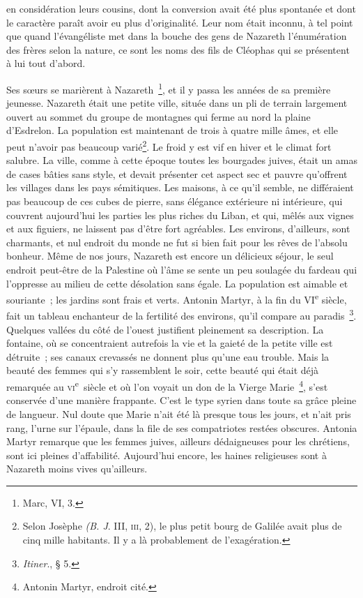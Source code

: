 \documentclass[french,twoside]{book} %
\begin{document}
en considération leurs cousins, dont la conversion avait été plus spontanée et dont le caractère paraît avoir eu plus d’originalité. Leur nom était inconnu, à tel point que quand l’évangéliste met dans la bouche des gens de Nazareth l’énumération des frères selon la nature, ce sont les noms des fils de Cléophas qui se présentent à lui tout d’abord.\par
Ses sœurs se marièrent à Nazareth \footnote{Marc, VI, 3.}, et il y passa les années de sa première jeunesse. Nazareth était une petite ville, située dans un pli de terrain largement ouvert au sommet du groupe de montagnes qui ferme au nord la plaine d’Esdrelon. La population est maintenant de trois à quatre mille âmes, et elle peut n’avoir pas beaucoup varié\footnote{Selon Josèphe {\itshape (B. J}. III, \textsc{iii}, 2), le plus petit bourg de Galilée avait plus de cinq mille habitants. Il y a là probablement de l’exagération.}. Le froid y est vif en hiver et le climat fort salubre. La ville, comme à cette époque toutes les bourgades juives, était un amas de cases bâties sans style, et devait présenter cet aspect sec et pauvre qu’offrent les villages dans les pays sémitiques. Les maisons, à ce qu’il semble, ne différaient pas beaucoup de ces cubes de pierre, sans élégance extérieure ni intérieure, qui couvrent aujourd’hui les parties les plus riches du Liban, et qui, mêlés aux vignes et aux figuiers, ne laissent pas d’être fort agréables. Les environs, d’ailleurs, sont charmants, et nul endroit du monde ne fut si bien fait pour les rêves de l’absolu bonheur. Même de nos jours, Nazareth est encore un délicieux séjour, le seul endroit peut-être de la Palestine où l’âme se sente un peu soulagée du fardeau qui l’oppresse au milieu de cette désolation sans égale. La population est aimable et souriante ; les jardins sont frais et verts. Antonin Martyr, à la fin du VI\textsuperscript{e} siècle, fait un tableau enchanteur de la fertilité des environs, qu’il compare au paradis \footnote{{\itshape Itiner}., § 5.}. Quelques vallées du côté de l’ouest justifient pleinement sa description. La fontaine, où se concentraient autrefois la vie et la gaieté de la petite ville est détruite ; ses canaux crevassés ne donnent plus qu’une eau trouble. Mais la beauté des femmes qui s’y rassemblent le soir, cette beauté qui était déjà remarquée au \textsc{vi}\textsuperscript{e} siècle et où l’on voyait un don de la Vierge Marie \footnote{Antonin Martyr, endroit cité.}, s’est conservée d’une manière frappante. C’est le type syrien dans toute sa grâce pleine de langueur. Nul doute que Marie n’ait été là presque tous les jours, et n’ait pris rang, l’urne sur l’épaule, dans la file de ses compatriotes restées obscures. Antonia Martyr remarque que les femmes juives, ailleurs dédaigneuses pour les chrétiens, sont ici pleines d’affabilité. Aujourd’hui encore, les haines religieuses sont à Nazareth moins vives qu’ailleurs.\par
\end{document}
